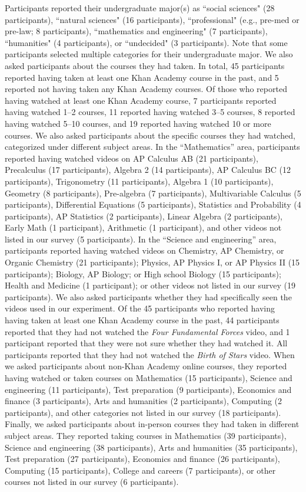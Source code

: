 \documentclass[10pt]{article}
\begin{document}
Participants reported their undergraduate major(s) as ``social sciences" (28
participants), ``natural sciences" (16 participants), ``professional" (e.g., pre-med or pre-law; 8
participants), ``mathematics and engineering" (7 participants), ``humanities" (4
participants), or ``undecided" (3 participants). Note that some participants
selected multiple categories for their undergraduate major. We also asked
participants about the courses they had taken. In total, 45 participants
reported having taken at least one Khan Academy course in the past, 
and 5 reported not having taken any Khan
Academy courses. Of those who reported having watched at least one
Khan Academy course, 7 participants reported having watched 1--2 courses, 11
reported having watched 3--5 courses, 8 reported having watched 5--10 courses,
and 19 reported having watched 10 or more courses. We also asked participants
about the specific courses they had watched, categorized under different
subject areas. In the ``Mathematics'' area, participants reported having watched
videos on AP Calculus AB (21 participants), Precalculus (17 participants),
Algebra 2 (14 participants), AP Calculus BC (12 participants), Trigonometry (11
participants), Algebra 1 (10 participants), Geometry (8 participants),
Pre-algebra (7 participants), Multivariable Calculus (5 participants),
Differential Equations (5 participants), Statistics and Probability (4
participants), AP Statistics (2 participants), Linear Algebra (2 participants),
Early Math (1 participant), Arithmetic (1 participant), and other videos not
listed in our survey (5 participants). In the ``Science and engineering'' area,
participants reported having watched videos on Chemistry, AP Chemistry, or
Organic Chemistry (21 participants); Physics, AP Physics I, or AP Physics II (15
participants); Biology, AP Biology; or High school Biology (15 participants);
Health and Medicine (1 participant); or other videos not listed in our survey
(19 participants). We also asked participants whether they had specifically seen the
videos used in our experiment. Of the 45 participants who reported having having
taken at least one Khan Academy course in the past, 44 participants reported that they had not watched the \textit{Four Fundamental Forces} video, and 1 participant reported that they were not sure whether they had watched it. All participants reported that they had not watched the \textit{Birth of Stars} video.
When we asked participants about non-Khan
Academy online courses, they reported having watched or taken courses on
Mathematics (15 participants), Science and engineering (11 participants), Test
preparation (9 participants), Economics and finance (3 participants), Arts and
humanities (2 participants), Computing (2 participants), and other categories
not listed in our survey (18 participants). Finally, we asked participants
about in-person courses they had taken in different subject areas. They
reported taking courses in Mathematics (39 participants), Science and
engineering (38 participants), Arts and humanities (35 participants), Test
preparation (27 participants), Economics and finance (26 participants),
Computing (15 participants), College and careers (7 participants), or other
courses not listed in our survey (6 participants).
\end{document}
